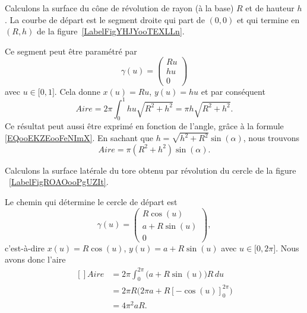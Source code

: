 \begin{example}     \label{EXooZCLXooVmXQgY}
	Calculons la surface du cône de révolution de rayon (à la base) \( R\) et de hauteur \( h\). La courbe de départ est le segment droite qui part de \( (0,0)\) et qui termine en \( (R,h)\) de la figure~\ref{LabelFigYHJYooTEXLLn}. %
	\newcommand{\CaptionFigYHJYooTEXLLn}{En faisant tourner cette droite autour de l'axe \( X\), nous obtenons un cône.}
	

	Ce segment peut être paramétré par
	\begin{equation}
		\gamma(u)=\begin{pmatrix}
			Ru \\
			hu \\
			0
		\end{pmatrix}
	\end{equation}
	avec \( u\in\mathopen[ 0 , 1 \mathclose]\). Cela donne \( x(u)=Ru\), \( y(u)=hu\) et par conséquent
	\begin{equation}
		Aire=2\pi\int_0^1hu\sqrt{R^2+h^2}=\pi h\sqrt{R^2+h^2}.
	\end{equation}
	Ce résultat peut aussi être exprimé en fonction de l'angle, grâce à la formule \eqref{EQooEKZEooFeNImX}. En sachant que \( h=\sqrt{h^2+R^2}\sin(\alpha)\), nous trouvons
	\begin{equation}
		Aire=\pi(R^2+h^2)\sin(\alpha).
	\end{equation}

\end{example}

\begin{example}
	Calculons la surface latérale du tore obtenu par révolution du cercle de la figure ~\ref{LabelFigROAOooPgUZIt}. %
	\newcommand{\CaptionFigROAOooPgUZIt}{Si nous tournons ce cercle autour de l'axe \( X\), nous obtenons un tore de rayon «externe» \( a\) et de rayon «interne» \( R\).}
	

	Le chemin qui détermine le cercle de départ est
	\begin{equation}
		\gamma(u)=\begin{pmatrix}
			R\cos(u)   \\
			a+R\sin(u) \\
			0
		\end{pmatrix},
	\end{equation}
	c'est-à-dire \( x(u)=R\cos(u)\), \( y(u)=a+R\sin(u)\) avec \( u\in\mathopen[ 0 , 2\pi \mathclose]\). Nous avons donc l'aire
	\begin{equation}
		\begin{aligned}[]
			Aire & =2\pi\int_0^{2\pi}\big( a+R\sin(u) \big)R\,du  \\
			     & =2\pi R\big( 2\pi a+R[-\cos(u)]_0^{2\pi} \big) \\
			     & =4\pi^2aR.
		\end{aligned}
	\end{equation}
\end{example}

